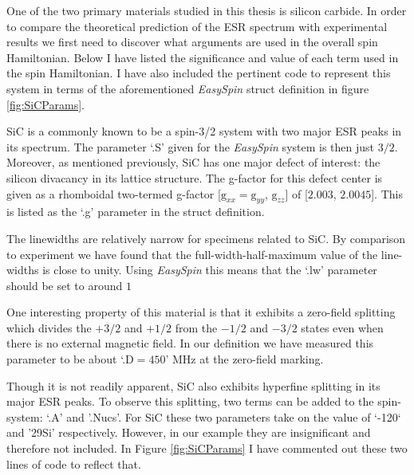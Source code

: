 \documentclass[oneside, astronomy, noacknowlegments]{BYUPhys}
\begin{document}
One of the two primary materials studied in this thesis is silicon carbide. In order to compare the theoretical prediction of the ESR spectrum with experimental results we first need to discover what arguments are used in the overall spin Hamiltonian. Below I have listed the significance and value of each term used in the spin Hamiltonian. I have also included the pertinent code to represent this system in terms of the aforementioned \textit{EasySpin} struct definition in figure \ref{fig:SiCParams}.

SiC is a commonly known to be a spin-3/2 system with two major ESR peaks in its spectrum. The parameter `.S' given for the \textit{EasySpin} system is then just $3/2$. Moreover, as mentioned previously, SiC has one major defect of interest: the silicon divacancy in its lattice structure. The g-factor for this defect center is given as a rhomboidal two-termed g-factor [$\text{g}_{xx}=\text{g}_{yy}$, $\text{g}_{zz}$] of [$2.003$, $2.0045$]. This is listed as the `.g' parameter in the struct definition.

The linewidths are relatively narrow for specimens related to SiC. By comparison to experiment we have found that the full-width-half-maximum value of the line-widths is close to unity. Using \textit{EasySpin} this means that the `.lw' parameter should be set to around $1$

One interesting property of this material is that it exhibits a zero-field splitting which divides the $+3/2$ and $+1/2$ from the $-1/2$ and $-3/2$ states even when there is no external magnetic field. In our definition we have measured this parameter to be about `.D$=450$' MHz at the zero-field marking.

Though it is not readily apparent, SiC also exhibits hyperfine splitting in its major ESR peaks. To observe this splitting, two terms can be added to the spin-system: `.A' and '.Nucs'. For SiC these two parameters take on the value of `-120` and '29Si' respectively. However, in our example they are insignificant and therefore not included. In Figure \ref{fig:SiCParams} I have commented out these two lines of code to reflect that.
\end{document}
